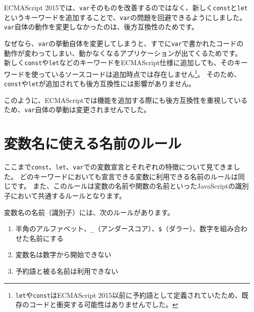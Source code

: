 \begin{tcolorbox}[title=なぜ\texttt{let}や\texttt{const}は追加されたのか？]\label{why-add-let-and-const}

ECMAScript
2015では、\texttt{var}そのものを改善するのではなく、新しく\texttt{const}と\texttt{let}というキーワードを追加することで、\texttt{var}の問題を回避できるようにしました。\texttt{var}自体の動作を変更しなかったのは、後方互換性のためです。

なぜなら、\texttt{var}の挙動自体を変更してしまうと、すでに\texttt{var}で書かれたコードの動作が変わってしまい、動かなくなるアプリケーションが出てくるためです。
新しく\texttt{const}や\texttt{let}などのキーワードをECMAScript仕様に追加しても、そのキーワードを使っているソースコードは追加時点では存在しません\footnote{\texttt{let}や\texttt{const}はECMAScript 2015以前に予約語として定義されていたため、既存のコードと衝突する可能性はありませんでした。}。
そのため、\texttt{const}や\texttt{let}が追加されても後方互換性には影響がありません。

このように、ECMAScriptでは機能を追加する際にも後方互換性を重視しているため、\texttt{var}自体の挙動は変更されませんでした。
\end{tcolorbox}

\hypertarget{variable-name}{%
\section{変数名に使える名前のルール}\label{variable-name}}

ここまで\texttt{const}、\texttt{let}、\texttt{var}での変数宣言とそれぞれの特徴について見てきました。
どのキーワードにおいても宣言できる変数に利用できる名前のルールは同じです。
また、このルールは変数の名前や関数の名前といったJavaScriptの識別子において共通するルールとなります。

変数名の名前（識別子）には、次のルールがあります。

\begin{enumerate}
\def\labelenumi{\arabic{enumi}.}
\item
  半角のアルファベット、\texttt{\_}（アンダースコア）、\texttt{\$}（ダラー）、数字を組み合わせた名前にする
\item
  変数名は数字から開始できない
\item
  予約語と被る名前は利用できない
\end{enumerate}

